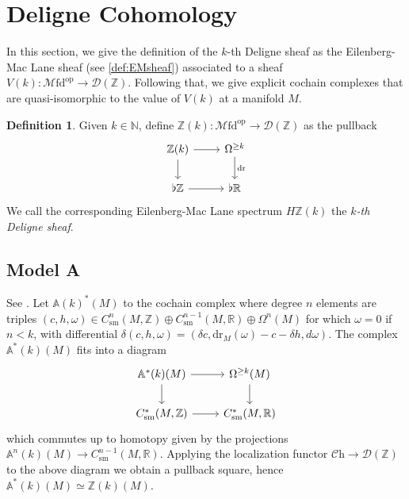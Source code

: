 \documentclass[a4paper]{book}
\newcommand{\bA}{\mathbb{A}}
\newcommand{\lC}{\mathcal{C}}
\newcommand{\lD}{\mathcal{D}}
\newcommand{\lM}{\mathcal{M}}
\newcommand{\bN}{\mathbb{N}}
\newcommand{\bR}{\mathbb{R}}
\newcommand{\bZ}{\mathbb{Z}}
\newcommand{\op}{\mathrm{op}}
\newcommand{\Ch}{\lC\mathrm{h}} %
\newcommand{\Mfd}{\lM\mathrm{fd}} %
\newcommand{\sm}{\mathrm{sm}}
\theoremstyle{definition}
\newtheorem{definition}[equation]{Definition}
\theoremstyle{remark}
\numberwithin{equation}{section}
\begin{document}
\section{Deligne Cohomology}

In this section, we give the definition of the $k$-th Deligne sheaf as the Eilenberg-Mac Lane sheaf (see \cref{def:EMsheaf}) associated to a sheaf $V(k):\Mfd^{\op}\to\lD(\bZ)$. Following that, we give explicit cochain complexes that are quasi-isomorphic to the value of $V(k)$ at a manifold $M$. 
\begin{definition}\label{def:deligne}
  Given $k\in\bN$, define ${\bZ}(k):\Mfd^{\op}\to\lD(\bZ)$ as the pullback 
  \[\begin{tikzcd}
    {\bZ}(k)\arrow[r]\arrow[d] & \Omega^{\geq k}\arrow[d,"\mathrm{dr}"] \\
    \flat\bZ \arrow[r] & \flat\bR
  \end{tikzcd}\]
  We call the corresponding Eilenberg-Mac Lane spectrum $H{\bZ}(k)$ the $k$\emph{-th Deligne sheaf}.
\end{definition}
\subsection{Model A}\label{mod:A} See {\cite[\S 3.2]{hopkinssinger2005diffcoh}}. Let $\bA(k)^*(M)$ to the cochain complex where degree $n$ elements are triples $(c,h,\omega)\in C_\sm^n(M,\bZ)\oplus C_\sm^{n-1}(M,\bR)\oplus\Omega^n(M)$ for which $\omega=0$ if $n<k$, with differential $\delta(c,h,\omega)=(\delta c,\mathrm{dr}_M(\omega)-c-\delta h,d\omega)$. The complex $\bA^*(k)(M)$ fits into a diagram
\[\begin{tikzcd}
    \bA^*(k)(M)\arrow[d]\arrow[r] & \Omega^{\geq k}(M)\arrow[d] \\
    C_\sm^*(M,\bZ) \arrow[r] & C_\sm^*(M,\bR)
  \end{tikzcd}\]which commutes up to homotopy given by the projections $\bA^n(k)(M)\to C_\sm^{n-1}(M,\bR)$. Applying the localization functor $\Ch\to\lD(\bZ)$ to the above diagram we obtain a pullback square, hence $\bA^*(k)(M)\simeq\bZ(k)(M)$. 
\end{document}
